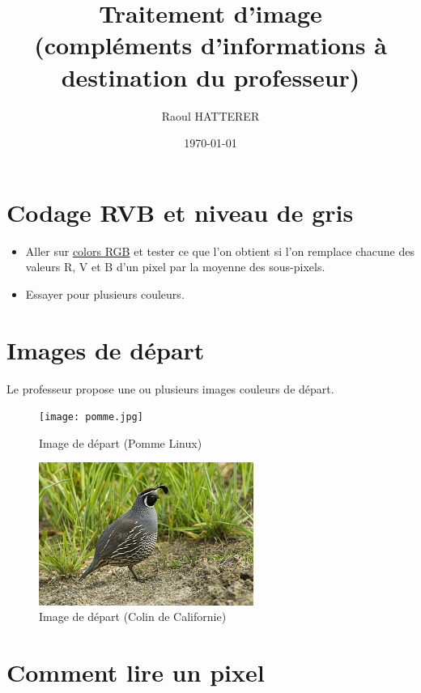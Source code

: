 \documentclass[11pt]{article}
\author{Raoul HATTERER}
\date{\today}
\title{Traitement d'image\\\medskip
\large (compléments d'informations à destination du professeur)}
\begin{document}
\maketitle
\setcounter{tocdepth}{1}
\tableofcontents



\section{Codage RVB et niveau de gris}
\label{sec:org63f276f}

\begin{itemize}
\item Aller sur \href{https://www.w3schools.com/colors/colors\_rgb.asp}{colors RGB} et tester ce que l'on obtient si l'on remplace chacune des valeurs R, V et B d'un pixel par la moyenne des sous-pixels.
\item Essayer pour plusieurs couleurs.
\end{itemize}


\section{Images de départ}
\label{sec:org14360fc}

Le professeur propose une ou plusieurs images couleurs de départ.

\begin{figure}[htbp]
\centering
\texttt{[image: pomme.jpg]}
\caption{Image de départ (Pomme Linux)}
\end{figure}



\begin{figure}[htbp]
\centering
\includegraphics[width=7cm]{California_Quail.jpg}
\caption{Image de départ (Colin de Californie)}
\end{figure}


\section{Comment lire un pixel}
\label{sec:orgb1eec5b}
\end{document}
